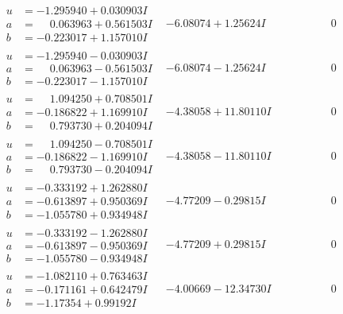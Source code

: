 \documentclass[1p]{elsarticle_modified}
\theoremstyle{definition}
\begin{document}
$$\begin{array}{c|c|c}
\begin{aligned}
u &= -1.295940 + 0.030903 I \\
a &= \phantom{-}0.063963 + 0.561503 I \\
b &= -0.223017 + 1.157010 I\end{aligned}
 & -6.08074 + 1.25624 I & \phantom{-0.000000 } 0 \\ \hline\begin{aligned}
u &= -1.295940 - 0.030903 I \\
a &= \phantom{-}0.063963 - 0.561503 I \\
b &= -0.223017 - 1.157010 I\end{aligned}
 & -6.08074 - 1.25624 I & \phantom{-0.000000 } 0 \\ \hline\begin{aligned}
u &= \phantom{-}1.094250 + 0.708501 I \\
a &= -0.186822 + 1.169910 I \\
b &= \phantom{-}0.793730 + 0.204094 I\end{aligned}
 & -4.38058 + 11.80110 I & \phantom{-0.000000 } 0 \\ \hline\begin{aligned}
u &= \phantom{-}1.094250 - 0.708501 I \\
a &= -0.186822 - 1.169910 I \\
b &= \phantom{-}0.793730 - 0.204094 I\end{aligned}
 & -4.38058 - 11.80110 I & \phantom{-0.000000 } 0 \\ \hline\begin{aligned}
u &= -0.333192 + 1.262880 I \\
a &= -0.613897 + 0.950369 I \\
b &= -1.055780 + 0.934948 I\end{aligned}
 & -4.77209 - 0.29815 I & \phantom{-0.000000 } 0 \\ \hline\begin{aligned}
u &= -0.333192 - 1.262880 I \\
a &= -0.613897 - 0.950369 I \\
b &= -1.055780 - 0.934948 I\end{aligned}
 & -4.77209 + 0.29815 I & \phantom{-0.000000 } 0 \\ \hline\begin{aligned}
u &= -1.082110 + 0.763463 I \\
a &= -0.171161 + 0.642479 I \\
b &= -1.17354 + 0.99192 I\end{aligned}
 & -4.00669 - 12.34730 I & \phantom{-0.000000 } 0 \\ \hline\begin{aligned}

\end{aligned}
\end{array}$$
\end{document}

